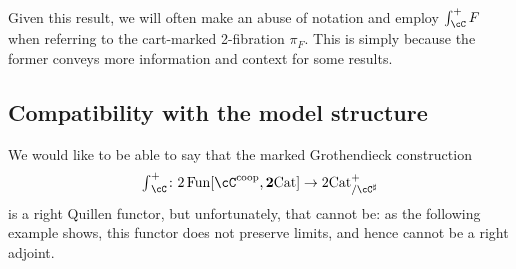 \documentclass[11pt, dvipsnames]{amsart}
\begin{document}
    Given this result, we will often make an abuse of notation and employ $\int^{+}_{\cC} F$ when referring to the cart-marked 2-fibration $\pi_F$. This is simply because the former conveys more information and context for some results.

    \subsection{Compatibility with the model structure}
    \label{subsec:construction_weak_left_adjoint} 
    We would like to be able to say that the marked Grothendieck construction 
    \[{\textstyle \int}_{\cC}^+\colon 2\Fun[\cC^{\coop},\ttwocat] \to \mslicetwocat \] 
    is a right Quillen functor, but unfortunately, that cannot be: as the following example shows, this functor does not preserve limits, and hence cannot be a right adjoint.   
\end{document}
